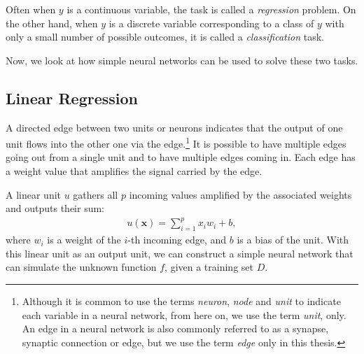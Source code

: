 \documentclass{now}
\newcommand{\vect}[1]{\mathbf{#1}}
\newcommand{\vx}[0]{\vect{x}}
\begin{document}
Often when $y$ is a continuous variable,
the task is called a \textit{regression} problem.
On the other hand, when $y$ is a discrete variable 
corresponding to a class of $y$ with only a small number of
possible outcomes, it is called a \textit{classification}
task.

Now, we look at how simple neural networks can be used to
solve these two tasks.

\subsection{Linear Regression}
\label{sec:linear_regression}

A directed edge between two units or neurons indicates that
the output of one unit flows into the other one via the
edge.\footnote{Although it is common to use the terms
\textit{neuron}, \textit{node} and \textit{unit} to indicate
each variable in a neural network, from here on, we use the
term \textit{unit}, only. An edge in a neural network is
also commonly referred to as a synapse, synaptic connection
or edge, but we use the term \textit{edge} only in this
thesis.} It is possible to have multiple edges going out
from a single unit and to have multiple edges coming in.
Each edge has a weight value that amplifies the signal
carried by the edge.

A linear unit $u$ gathers all $p$ incoming values amplified
by the associated weights and outputs their sum:
\begin{align}
    \label{eq:linear_unit}
    u(\vx) = \sum_{i=1}^p x_i w_i + b, 
\end{align}
where $w_i$ is a weight of the $i$-th incoming edge, and $b$
is a bias of the unit.  With this linear unit as an output
unit, we can construct a simple neural network that can
simulate the unknown function $f$, given a training set $D$. 
\end{document}
